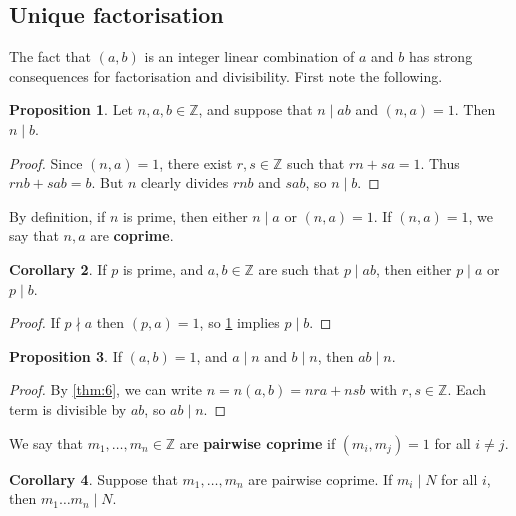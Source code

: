 \documentclass{article}
\newcommand{\Z}{\mathbb{Z}}
\newcommand{\rb}[1]{\left( #1 \right)}
\theoremstyle{definition}\newtheorem{definition}{Definition}
\theoremstyle{definition}\newtheorem{remark}[definition]{Remark}
\theoremstyle{definition}\newtheorem*{example}{Example}
\theoremstyle{definition}\newtheorem*{note}{Note}
\newtheorem{proposition}[definition]{Proposition}
\newtheorem{corollary}[definition]{Corollary}
\begin{document}
\subsection{Unique factorisation}

The fact that $ \rb{a, b} $ is an integer linear combination of $ a $ and $ b $ has strong consequences for factorisation and divisibility. First note the following.

\begin{proposition}
\label{prop:7}
Let $ n, a, b \in \Z $, and suppose that $ n \mid ab $ and $ \rb{n, a} = 1 $. Then $ n \mid b $.
\end{proposition}

\begin{proof}
Since $ \rb{n, a} = 1 $, there exist $ r, s \in \Z $ such that $ rn + sa = 1 $. Thus $ rnb + sab = b $. But $ n $ clearly divides $ rnb $ and $ sab $, so $ n \mid b $.
\end{proof}

By definition, if $ n $ is prime, then either $ n \mid a $ or $ \rb{n, a} = 1 $. If $ \rb{n, a} = 1 $, we say that $ n, a $ are \textbf{coprime}.


\begin{corollary}
\label{cor:8}
If $ p $ is prime, and $ a, b \in \Z $ are such that $ p \mid ab $, then either $ p \mid a $ or $ p \mid b $.
\end{corollary}

\begin{proof}
If $ p \nmid a $ then $ \rb{p, a} = 1 $, so \ref{prop:7} implies $ p \mid b $.
\end{proof}

\begin{proposition}
\label{prop:9}
If $ \rb{a, b} = 1 $, and $ a \mid n $ and $ b \mid n $, then $ ab \mid n $.
\end{proposition}

\begin{proof}
By \ref{thm:6}, we can write $ n = n\rb{a, b} = nra + nsb $ with $ r, s \in \Z $. Each term is divisible by $ ab $, so $ ab \mid n $.
\end{proof}

We say that $ m_1, \dots, m_n \in \Z $ are \textbf{pairwise coprime} if $ \rb{m_i, m_j} = 1 $ for all $ i \ne j $.

\begin{corollary}
\label{cor:10}
Suppose that $ m_1, \dots, m_n $ are pairwise coprime. If $ m_i \mid N $ for all $ i $, then $ m_1 \dots m_n \mid N $.
\end{corollary}
\end{document}
